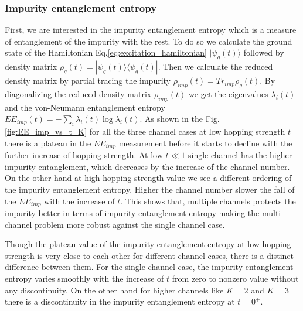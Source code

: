 \documentclass[reprint,prb,superscriptaddress]{revtex4-2}
\begin{document}
\subsubsection{Impurity entanglement entropy}
\noindent  First, we are interested in the impurity entanglement entropy which is a measure of entanglement of the impurity with the rest. To do so we calculate the ground state of the Hamiltonian Eq.\eqref{eq:excitation_hamiltonian} $|\psi_g(t)\rangle$ followed by density matrix $\rho_g(t)=|\psi_g(t)\rangle \langle\psi_g (t)|$. Then we calculate the reduced density matrix by partial tracing the impurity $\rho_{imp}(t)=Tr_{imp} \rho_g(t)$. By diagonalizing the reduced density matrix $\rho_{imp}(t)$ we get the eigenvalues $\lambda_i(t)$ and the von-Neumann entanglement entropy $EE_{imp}(t)=-\sum_i\lambda_i(t) \log \lambda_i(t)$. As shown in the Fig.\ref{fig:EE_imp_vs_t_K} for all the three channel cases at low hopping strength $t$ there is a plateau in the $EE_{imp}$ measurement before it starts to decline with the further increase of hopping strength. At low $t\ll 1$ single channel has the higher impurity entanglement, which decreases by the increase of the channel number. On the other hand at high hopping strength value we see a different ordering of the impurity entanglement entropy. Higher the channel number slower the fall of the $EE_{imp}$ with the increase of $t$. This shows that, multiple channels protects the impurity better in terms of impurity  entanglement entropy making the multi channel problem more robust against the single channel case. 
\par Though the plateau value of the impurity entanglement entropy at low hopping strength is very close to each other for different channel cases, there is a distinct difference between them. For the single channel case, the impurity entanglement entropy varies smoothly with the increase of $t$ from zero to nonzero value without any discontinuity. On the other hand for higher channels like $K=2$ and $K=3$ there is a discontinuity in the impurity entanglement entropy at $t=0^+$.
\end{document}
